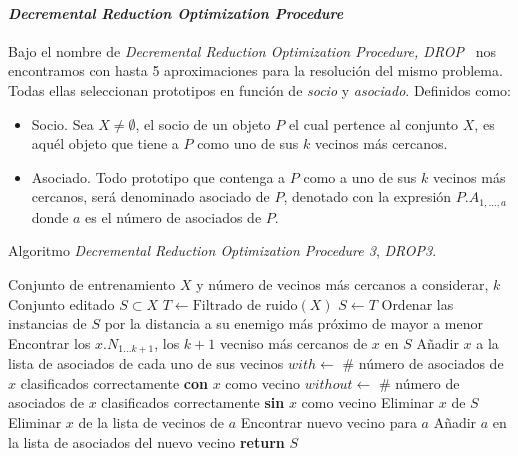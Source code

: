 \paragraph{\textit{Decremental Reduction Optimization Procedure}}\label{paragraph:DROP}
\hfill \break
Bajo el nombre de \textit{Decremental Reduction Optimization Procedure, DROP}~\cite{wilson2000reduction} nos encontramos con hasta 5 aproximaciones para la resolución del mismo problema. Todas ellas seleccionan prototipos en función de \textit{socio} y \textit{asociado}. Definidos como:
\begin{itemize}
\item Socio. Sea $X \not= \emptyset$, el socio de un objeto $P$ el cual pertence al conjunto $X$, es aquél objeto que tiene a $P$ como uno de sus $k$ vecinos más cercanos.
\item Asociado. Todo prototipo que contenga a $P$ como a uno de sus $k$ vecinos más cercanos, será denominado asociado de $P$, denotado con la expresión $P.A_{1,\dots,a}$ donde $a$ es el número de asociados de $P$.
\end{itemize}

\begin{algorithm}[H]
\caption{Algoritmo \textit{Decremental Reduction Optimization Procedure 3}, \textit{DROP3}.}\label{alg:DROP3}
\begin{algorithmic}[1]
\Require Conjunto de entrenamiento $X$ y número de vecinos más cercanos a considerar, $k$
\Ensure Conjunto editado $S \subset X$
\Statex
{}
	\State $T \leftarrow \text{Filtrado de ruido}(X)$ 
	\State $S \leftarrow T$
	\State Ordenar las instancias de $S$ por la distancia a su enemigo más próximo \Comment de mayor a menor
		\State Encontrar los $x.N_{1\dots k+1}$, los $k+1$ vecniso más cercanos de $x$ en $S$
		\State Añadir $x$ a la lista de asociados de cada uno de sus vecinos
	\EndFor
		\State $with \leftarrow$ \# número de asociados de $x$ clasificados correctamente \textbf{con} $x$ como vecino
		\State $without \leftarrow$ \# número de asociados de $x$ clasificados correctamente \textbf{sin} $x$ como vecino
			\State Eliminar $x$ de $S$
				\State Eliminar $x$ de la lista de vecinos de $a$
				\State Encontrar nuevo vecino para $a$
				\State Añadir $a$ en la lista de asociados del nuevo vecino
			\EndFor
		\EndIf
	\EndFor
	\State \textbf{return} $S$
\EndProcedure
\end{algorithmic}
\end{algorithm}

